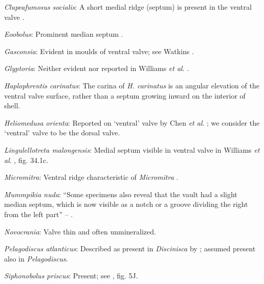 \documentclass[openany]{book}
\theoremstyle{definition}
\theoremstyle{definition}
\theoremstyle{definition}
\theoremstyle{remark}
\begin{document}
\hypertarget{Clupeafumosus_socialis-coding-104}{}
\emph{Clupeafumosus socialis}: A short medial ridge (septum) is present
in the ventral valve \citep{Topper2013Reappraisalof}.

\hypertarget{Eoobolus-coding-104}{}
\emph{Eoobolus}: Prominent median septum \citep[fig. 4d, e
in][]{Balthasar2009Thebrachiopod}.

\hypertarget{Gasconsia-coding-104}{}
\emph{Gasconsia}: Evident in moulds of ventral valve; see Watkins
\citeyearpar{Watkins2002Newrecord}.

\hypertarget{Glyptoria-coding-104}{}
\emph{Glyptoria}: Neither evident nor reported in Williams \emph{et al}.
\citeyearpar{Williams2000LinguliformeaCraniiformea}.

\hypertarget{Haplophrentis_carinatus-coding-104}{}
\emph{Haplophrentis carinatus}: The carina of \emph{H. carinatus} is an
angular elevation of the ventral valve surface, rather than a septum
growing inward on the interior of shell.

\hypertarget{Heliomedusa_orienta-coding-104}{}
\emph{Heliomedusa orienta}: Reported on `ventral' valve by Chen \emph{et
al}. \citeyearpar{Chen2007Reinterpretationof}; we consider the `ventral'
valve to be the dorsal valve.

\hypertarget{Lingulellotreta_malongensis-coding-104}{}
\emph{Lingulellotreta malongensis}: Medial septum visible in ventral
valve in Williams \emph{et al}.
\citeyearpar{Williams2000LinguliformeaCraniiformea}, fig. 34.1c.

\hypertarget{Micromitra-coding-104}{}
\emph{Micromitra}: Ventral ridge characteristic of \emph{Micromitra}
\citep{Skovsted2010EarlyCambrian}.

\hypertarget{Mummpikia_nuda-coding-104}{}
\emph{Mummpikia nuda}: ``Some specimens also reveal that the vault had a
slight median septum, which is now visible as a notch or a groove
dividing the right from the left part'' --
\citet{Balthasar2008iMummpikia}.

\hypertarget{Novocrania-coding-104}{}
\emph{Novocrania}: Valve thin and often unmineralized.

\hypertarget{Pelagodiscus_atlanticus-coding-104}{}
\emph{Pelagodiscus atlanticus}: Described as present in
\emph{Discinisca} by \citet{Chen2007Reinterpretationof}; assumed present
also in \emph{Pelagodiscus}.

\hypertarget{Siphonobolus_priscus-coding-104}{}
\emph{Siphonobolus priscus}: Present; see
\citet{Popov2009Earlyontogeny}, fig. 5J.
\end{document}
